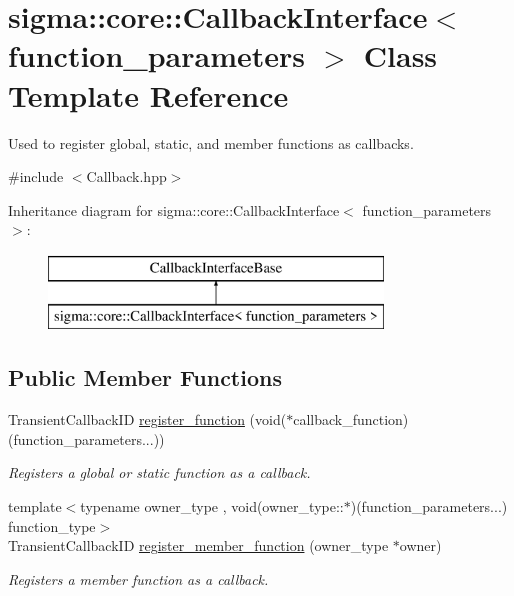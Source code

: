 \hypertarget{classsigma_1_1core_1_1_callback_interface}{\section{sigma\-:\-:core\-:\-:Callback\-Interface$<$ function\-\_\-parameters $>$ Class Template Reference}
\label{classsigma_1_1core_1_1_callback_interface}
}


Used to register global, static, and member functions as callbacks.  




{\ttfamily \#include $<$Callback.\-hpp$>$}

Inheritance diagram for sigma\-:\-:core\-:\-:Callback\-Interface$<$ function\-\_\-parameters $>$\-:\begin{figure}[H]
\begin{center}
\leavevmode
\includegraphics[height=2.000000cm]{classsigma_1_1core_1_1_callback_interface}
\end{center}
\end{figure}
\subsection*{Public Member Functions}
\begin{DoxyCompactItemize}
\item 
Transient\-Callback\-I\-D \hyperlink{classsigma_1_1core_1_1_callback_interface_a447678d82d322396c293aabc534e4e96}{register\-\_\-function} (void($\ast$callback\-\_\-function)(function\-\_\-parameters...))
\begin{DoxyCompactList}\small\item\em Registers a global or static function as a callback. \end{DoxyCompactList}\item 
{\footnotesize template$<$typename owner\-\_\-type , void(owner\-\_\-type\-::$\ast$)(function\-\_\-parameters...) function\-\_\-type$>$ }\\Transient\-Callback\-I\-D \hyperlink{classsigma_1_1core_1_1_callback_interface_aea30ba6ae89d5638e91db8ba2207854a}{register\-\_\-member\-\_\-function} (owner\-\_\-type $\ast$owner)
\begin{DoxyCompactList}\small\item\em Registers a member function as a callback. \end{DoxyCompactList}\end{DoxyCompactItemize}
